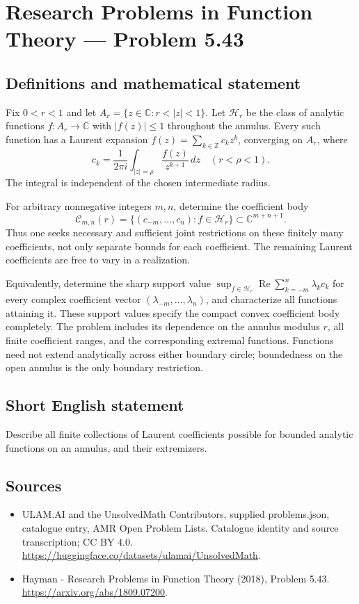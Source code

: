 \documentclass[11pt,a4paper]{article}
\begin{document}
\section*{Research Problems in Function Theory — Problem 5.43}\label{statement}

\subsection{Definitions and mathematical statement}
Fix $0<r<1$ and let $A_r=\{z\in\mathbb C:r<|z|<1\}$.
Let $\mathcal H_r$ be the class of analytic functions
$f:A_r\to\mathbb C$ with $|f(z)|\leq1$ throughout the annulus.
Every such function has a Laurent expansion
$f(z)=\sum_{k\in\mathbb Z}c_kz^k$, converging on $A_r$, where
\[
 c_k=\frac1{2\pi i}\int_{|z|=\rho}
                      \frac{f(z)}{z^{k+1}}\,dz
 \quad(r<\rho<1).
\]
The integral is independent of the chosen intermediate radius.

For arbitrary nonnegative integers $m,n$, determine the coefficient
body
\[
 \mathcal C_{m,n}(r)=
       \{(c_{-m},\ldots,c_n):f\in\mathcal H_r\}
       \subset\mathbb C^{m+n+1}.
\]
Thus one seeks necessary and sufficient joint restrictions on
these finitely many coefficients, not only separate bounds for
each coefficient. The remaining Laurent coefficients are free
to vary in a realization.

Equivalently, determine the sharp support value
$\sup_{f\in\mathcal H_r}\operatorname{Re}
\sum_{k=-m}^{n}\lambda_kc_k$
for every complex coefficient vector $(\lambda_{-m},\ldots,\lambda_n)$,
and characterize all functions attaining it. These support values
specify the compact convex coefficient body completely. The
problem includes its dependence on the annulus modulus $r$,
all finite coefficient ranges, and the corresponding extremal
functions. Functions need not extend analytically across either
boundary circle; boundedness on the open annulus is the
only boundary restriction.
\subsection{Short English statement}
Describe all finite collections of Laurent coefficients possible for bounded analytic functions on an annulus, and their extremizers.
\subsection{Sources}
\begin{itemize}
\item[S1] ULAM.AI and the UnsolvedMath Contributors, supplied problems.json, catalogue entry, AMR Open Problem Lists. Catalogue identity and source transcription; CC BY 4.0.
\url{https://huggingface.co/datasets/ulamai/UnsolvedMath}.
\item[S2] Hayman - Research Problems in Function Theory (2018), Problem 5.43. 
\url{https://arxiv.org/abs/1809.07200}.
\end{itemize}
\end{document}
